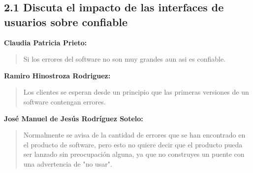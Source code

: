 \subsection*{2.1 Discuta el impacto de las interfaces de usuarios sobre confiable}

\textbf{Claudia Patricia Prieto:}
\begin{quote}
Si los errores del software no son muy grandes aun asi es confiable.
\end{quote}

\textbf{Ramiro Hinostroza Rodriguez:}
\begin{quote}
Los clientes se esperan desde un principio que las primeras versiones de un software contengan errores.
\end{quote}

\textbf{José Manuel de Jesús Rodríguez Sotelo:}
\begin{quote}
Normalmente se avisa de la cantidad de errores que se han encontrado en el producto de software, pero esto no quiere decir que el producto pueda ser lanzado sin preocupación alguna, ya que no construyes un puente con una advertencia de "no usar".
\end{quote}